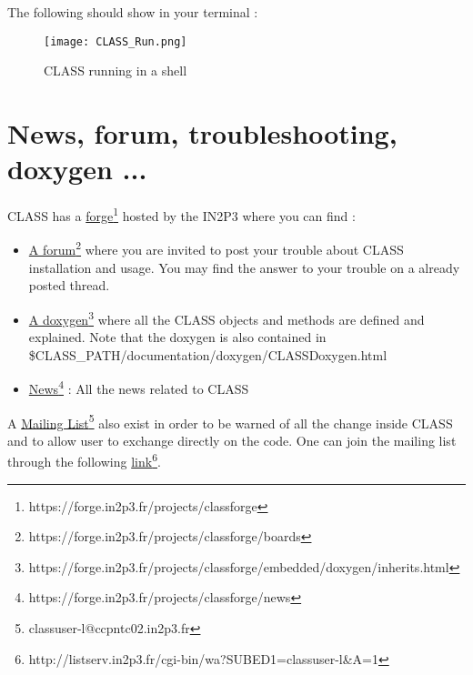 The following should show in your terminal :

    \begin{figure}[H]
    \centering
    \centerline{\texttt{[image: CLASS\_Run.png]}}
    \caption{CLASS running in a shell}
    \label{fig:CLASSRUN}
    \end{figure}




\chapter{News, forum, troubleshooting, doxygen ...}
CLASS has a \href{https://forge.in2p3.fr/projects/classforge}{forge}\footnote{https://forge.in2p3.fr/projects/classforge} hosted by the IN2P3  where you can find :

\begin{itemize}
\item \href{https://forge.in2p3.fr/projects/classforge/boards}{A forum}\footnote{https://forge.in2p3.fr/projects/classforge/boards} where you are invited to post your trouble about CLASS installation and usage. You may find the answer to your trouble on a already posted thread.
\item \href{https://forge.in2p3.fr/projects/classforge/embedded/doxygen/inherits.html}{A doxygen}\footnote{https://forge.in2p3.fr/projects/classforge/embedded/doxygen/inherits.html} where all the CLASS objects and methods are defined and explained. Note that the doxygen is also contained in \$CLASS\_PATH/documentation/doxygen/CLASSDoxygen.html
\item \href{https://forge.in2p3.fr/projects/classforge/news}{News}\footnote{https://forge.in2p3.fr/projects/classforge/news} : All the news related to CLASS
\end{itemize}
A \href{classuser-l@ccpntc02.in2p3.fr}{Mailing List}\footnote{classuser-l@ccpntc02.in2p3.fr} also exist in order to be warned of all the change inside CLASS and to allow user to exchange directly on the code. One can join the mailing list through the following  \href{http://listserv.in2p3.fr/cgi-bin/wa?SUBED1=classuser-l&A=1}{link}\footnote{http://listserv.in2p3.fr/cgi-bin/wa?SUBED1=classuser-l\&A=1}.



